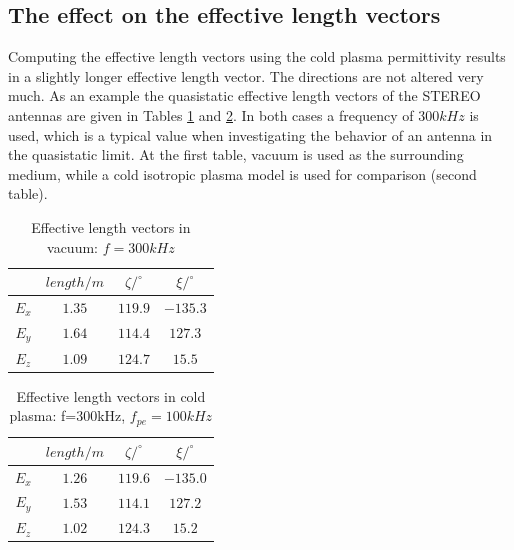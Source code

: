 \documentclass[a4paper,11pt]{thesis}
\begin{document}
\subsection{The effect on the effective length vectors}
Computing the effective length vectors using the cold plasma permittivity results in a slightly longer effective length vector. The directions are not altered very much. As an example the quasistatic effective length vectors of the STEREO antennas are given in Tables \ref{tab:heff_vacuum} and \ref{tab:heff_cold_plasma}. In both cases a frequency of $300kHz$ is used, which is a typical value when investigating the behavior of an antenna in the quasistatic limit. At the first table, vacuum is used as the surrounding medium, while a cold isotropic plasma model is used for comparison (second table).


\begin{table}
\begin{center}
\caption{Effective length vectors in vacuum: $f=300kHz$}
\label{tab:heff_vacuum}
\begin{tabular}{|c|c|c|c|}
 \hline
 & $length/m$ & $\zeta/^\circ$ & $\xi/^\circ$ \\
\hline
$E_x$ & $1.35$ & $119.9$ & $-135.3$ \\
$E_y$ & $1.64$ & $114.4$ & $127.3$ \\
$E_z$ & $1.09$ & $124.7$ & $15.5$ \\
\hline\end{tabular}
\end{center}
\end{table}



\begin{table}
\begin{center}
\caption{Effective length vectors in cold plasma: f=300kHz, $f_{pe}=100kHz$}
\label{tab:heff_cold_plasma}
\begin{tabular}{|c|c|c|c|}
 \hline
 & $length/m$ & $\zeta/^\circ$ & $\xi/^\circ$ \\
\hline
$E_x$ & $1.26$ & $119.6$ & $-135.0$ \\
$E_y$ & $1.53$ & $114.1$ & $127.2$ \\
$E_z$ & $1.02$ & $124.3$ & $15.2$ \\
\hline\end{tabular}
\end{center}
\end{table}
\end{document}
